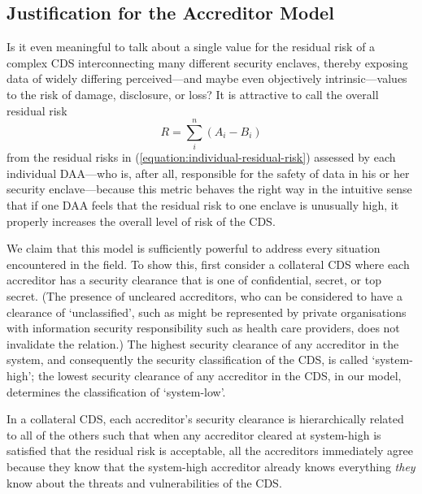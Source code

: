 \documentclass{llncs}
\begin{document}
\subsection{Justification for the Accreditor Model}

Is it even meaningful to talk about a single value for the residual risk
of a complex CDS interconnecting many different security enclaves, thereby
exposing data of widely differing perceived---and maybe even objectively
intrinsic---values to the risk of damage, disclosure, or loss?  It is
attractive to call the overall residual risk
\begin{equation}\label{equation:residual-risk}
R = \sum_i^n \left(A_i - B_i\right)
\end{equation}
from the residual risks in (\ref{equation:individual-residual-risk}) assessed
by each individual DAA---who is, after all, responsible
for the safety of data in his or her security enclave---because this metric behaves
the right way in the intuitive sense that if one DAA feels that the residual
risk to one enclave is unusually high, it properly increases the overall
level of risk of the CDS.

We claim that this model is sufficiently powerful to address every situation
encountered in the field.  To show this, first consider a collateral CDS
where each accreditor has a security clearance that is one of confidential,
secret, or top secret.  (The presence of uncleared accreditors, who can be considered
to have a clearance of `unclassified', such as might be represented by private
organisations with information security responsibility such as health care providers,
does not invalidate the relation.)  The highest security clearance of any accreditor
in the system, and consequently the security classification of the CDS, is called
`system-high'; the lowest security clearance of any accreditor in the CDS, in our
model, determines the classification of `system-low'.

In a collateral CDS, each accreditor's security clearance is hierarchically related
to all of the others such that when any accreditor cleared at system-high is satisfied
that the residual risk is acceptable, all the accreditors immediately agree because
they know that the system-high accreditor already knows everything \emph{they} know
about the threats and vulnerabilities of the CDS.
\end{document}
